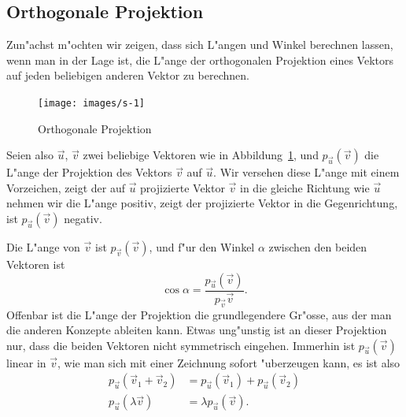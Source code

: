 \subsection{Orthogonale Projektion}
Zun"achst m"ochten wir zeigen, dass sich L"angen und Winkel berechnen
lassen, wenn man in der Lage ist, die L"ange der orthogonalen Projektion
eines Vektors auf jeden beliebigen anderen Vektor zu berechnen.
\begin{figure}
\begin{center}
\texttt{[image: images/s-1]}
\end{center}
\caption{Orthogonale Projektion\label{orthproj}}
\end{figure}

Seien also $\vec u$, $\vec v$ zwei beliebige Vektoren wie in Abbildung~\ref{orthproj}, und $p_{\vec u}(\vec v)$
die L"ange der Projektion des Vektors $\vec v$ auf $\vec u$.
Wir versehen diese L"ange mit einem Vorzeichen, zeigt der auf $\vec u$
projizierte Vektor $\vec v$ in die gleiche Richtung wie $\vec u$ 
nehmen wir die L"ange positiv, zeigt der projizierte Vektor in die
Gegenrichtung, ist $p_{\vec u}(\vec v)$ negativ.

Die L"ange von $\vec v$ ist $p_{\vec v}(\vec v)$, und f"ur den Winkel
$\alpha$ zwischen den beiden Vektoren ist
\begin{equation}
\cos \alpha = \frac{p_{\vec u}(\vec v)}{p_{\vec v}{\vec v}}.
\label{zwischenwinkel}
\end{equation}
Offenbar ist die L"ange der Projektion die grundlegendere Gr"osse,
aus der man die anderen Konzepte ableiten kann. Etwas ung"unstig
ist an dieser Projektion nur, dass die beiden Vektoren nicht
symmetrisch eingehen.
Immerhin ist $p_{\vec u}(\vec v)$ linear in $\vec v$, wie man
sich mit einer 
Zeichnung sofort "uberzeugen kann, es ist also
\begin{align*}
p_{\vec u}(\vec v_1+\vec v_2)&=p_{\vec u}(\vec v_1)+p_{\vec u}(\vec v_2)\\
p_{\vec u}(\lambda \vec v)&=\lambda p_{\vec u}(\vec v).
\end{align*}

